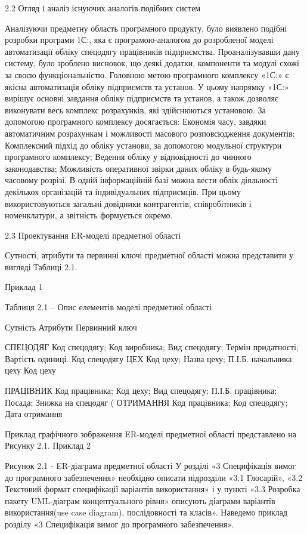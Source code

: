 	2.2 Огляд і аналіз існуючих аналогів  подібних систем 

	Аналізуючи предметну область програмного продукту,  було виявлено подібні розробки   програми 1С:, яка є програмою-аналогом до розробленої моделі автоматизації обліку спецодягу працівників підприємства. Проаналізувавши дану систему, було зроблено висновок, що деякі додатки, компоненти та модулі схожі за своєю функціональністю. Головною метою програмного комплексу «1С:» є якісна автоматизація обліку підприємств та установ. У цьому напрямку «1С:» вирішує основні завдання обліку підприємств та установ, а також дозволяє виконувати весь комплекс розрахунків, які здійснюються установою. За допомогою програмного комплексу досягається: Економія часу, завдяки автоматичним розрахункам і можливості масового розповсюдження документів; Комплексний підхід до обліку установи, за допомогою модульної структури програмного комплексу; Ведення обліку у відповідності до чинного законодавства; Можливість оперативної звірки даних обліку в будь-якому часовому розрізі. В одній інформаційній базі можна вести облік діяльності декількох організацій та індивідуальних підприємців. При цьому використовуються загальні довідники контрагентів, співробітників і номенклатури, а звітність формується окремо. 

	2.3 Проектування ER-моделі предметної області 

	Сутності, атрибути та первинні ключі предметної області можна представити у вигляді Таблиці 2.1.

Приклад 1

Таблиця 2.1 – Опис елементів моделі  предметної області

Сутність	Атрибути	Первинний ключ

СПЕЦОДЯГ	Код спецодягу; 
Код виробника; 
Вид спецодягу; Термін придатності; Вартість одиниці.	Код спецодягу
ЦЕХ	Код цеху; 
Назва цеху; 
П.І.Б. начальника цеху	Код цеху

ПРАЦІВНИК	Код працівника; 
Код цеху; 
Вид спецодягу; П.І.Б. працівника; Посада; 
Знижка на спецодяг (%
ОТРИМАННЯ	Код працівника; 
Код спецодягу; 
Дата отримання 	

Приклад графічного зображення ER-моделі предметної області представлено на Рисунку 2.1.
Приклад 2
 
Рисунок 2.1 -  ER-діаграма предметної області
	У розділі «3 Специфікація вимог до програмного забезпечення» необхідно описати  підрозділи «3.1 Глосарій», «3.2 Текстовий формат специфікації варіантів використання» і у пункті «3.3 Розробка пакету UML-діаграм концептуального рівня» описують діаграми варіантів використання(use case diagram), послідовності  та класів».
Наведемо приклад розділу «3 Специфікація вимог до програмного забезпечення».
	
